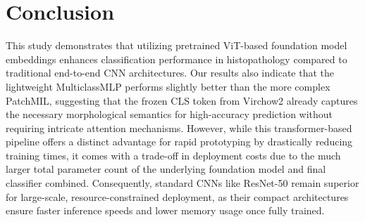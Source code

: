 \documentclass[a4paper,12pt]{article}
\begin{document}



\section{Conclusion}
This study demonstrates that utilizing pretrained ViT-based foundation model embeddings enhances classification performance in histopathology compared to traditional end-to-end CNN architectures. Our results also indicate that the lightweight MulticlassMLP performs slightly better than the more complex PatchMIL, suggesting that the frozen CLS token from Virchow2 already captures the necessary morphological semantics for high-accuracy prediction without requiring intricate attention mechanisms. However, while this transformer-based pipeline offers a distinct advantage for rapid prototyping by drastically reducing training times, it comes with a trade-off in deployment costs due to the much larger total parameter count of the underlying foundation model and final classifier combined. Consequently, standard CNNs like ResNet-50 remain superior for large-scale, resource-constrained deployment, as their compact architectures ensure faster inference speeds and lower memory usage once fully trained.
\end{document}

